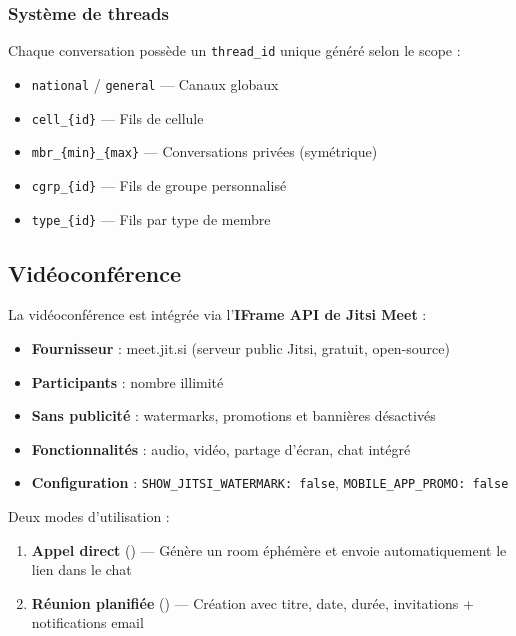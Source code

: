 \documentclass[12pt,a4paper]{article}
\begin{document}
\subsubsection{Système de threads}

Chaque conversation possède un \texttt{thread\_id} unique généré selon le scope :
\begin{itemize}
    \item \texttt{national} / \texttt{general} — Canaux globaux
    \item \texttt{cell\_\{id\}} — Fils de cellule
    \item \texttt{mbr\_\{min\}\_\{max\}} — Conversations privées (symétrique)
    \item \texttt{cgrp\_\{id\}} — Fils de groupe personnalisé
    \item \texttt{type\_\{id\}} — Fils par type de membre
\end{itemize}

\subsection{Vidéoconférence}

\begin{techbox}
La vidéoconférence est intégrée via l'\textbf{IFrame API de Jitsi Meet} :
\begin{itemize}
    \item \textbf{Fournisseur} : meet.jit.si (serveur public Jitsi, gratuit, open-source)
    \item \textbf{Participants} : nombre illimité
    \item \textbf{Sans publicité} : watermarks, promotions et bannières désactivés
    \item \textbf{Fonctionnalités} : audio, vidéo, partage d'écran, chat intégré
    \item \textbf{Configuration} : \texttt{SHOW\_JITSI\_WATERMARK: false}, \texttt{MOBILE\_APP\_PROMO: false}
\end{itemize}
\end{techbox}

Deux modes d'utilisation :
\begin{enumerate}
    \item \textbf{Appel direct} (\faVideo) — Génère un room éphémère et envoie automatiquement le lien dans le chat
    \item \textbf{Réunion planifiée} (\faCalendarPlus) — Création avec titre, date, durée, invitations + notifications email
\end{enumerate}
\end{document}
